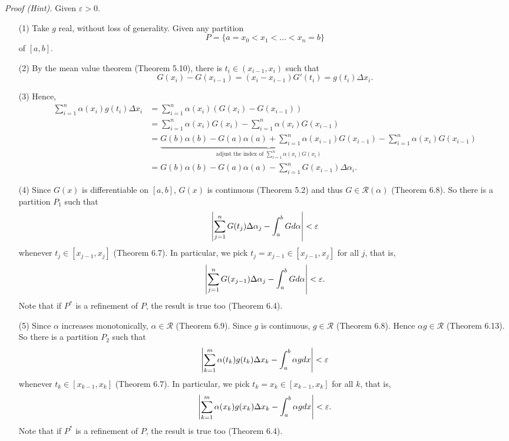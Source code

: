 \documentclass{article}
\begin{document}
\emph{Proof (Hint).}
Given $\varepsilon > 0$.
\begin{enumerate}
  \item[(1)]
  Take $g$ real, without loss of generality.
  Given any partition
  \[
    P = \{a = x_0 < x_1 < \ldots < x_n = b\}
  \]
  of $[a,b]$.

  \item[(2)]
  By the mean value theorem (Theorem 5.10), there is $t_i \in (x_{i-1},x_i)$
  such that
  \[
    G(x_i) - G(x_{i-1}) = (x_i - x_{i-1})G'(t_i) = g(t_i)\Delta x_i.
  \]

  \item[(3)]
  Hence,
  \begin{align*}
    \sum_{i=1}^{n} \alpha(x_i)g(t_i)\Delta x_i
    &= \sum_{i=1}^{n} \alpha(x_i)(G(x_i) - G(x_{i-1})) \\
    &= \sum_{i=1}^{n} \alpha(x_i)G(x_i) - \sum_{i=1}^{n} \alpha(x_i)G(x_{i-1}) \\
    &= \underbrace{G(b)\alpha(b) - G(a)\alpha(a)
      + \sum_{i=1}^{n} \alpha(x_{i-1})G(x_{i-1})}_{\text{
        adjust the index of $\sum_{i=1}^{n} \alpha(x_i)G(x_i)$}}
      - \sum_{i=1}^{n} \alpha(x_i)G(x_{i-1}) \\
    &= G(b)\alpha(b) - G(a)\alpha(a) - \sum_{i=1}^{n} G(x_{i-1}) \Delta\alpha_i.
  \end{align*}

  \item[(4)]
  Since $G(x)$ is differentiable on $[a,b]$,
  $G(x)$ is continuous (Theorem 5.2) and thus $G \in \mathscr{R}(\alpha)$ (Theorem 6.8).
  So there is a partition $P_1$ such that
  \[
    \abs{\sum_{j=1}^{n} G(t_j)\Delta\alpha_j - \int_{a}^{b}G d\alpha }
    < \varepsilon
  \]
  whenever $t_j \in [x_{j-1},x_j]$ (Theorem 6.7).
  In particular, we pick $t_j = x_{j-1} \in [x_{j-1},x_j]$ for all $j$, that is,
  \[
    \abs{\sum_{j=1}^{n} G(x_{j-1})\Delta\alpha_j - \int_{a}^{b}G d\alpha }
    < \varepsilon.
  \]
  Note that if $P^{*}$ is a refinement of $P$, the result is true too (Theorem 6.4).

  \item[(5)]
  Since $\alpha$ increases monotonically, $\alpha \in \mathscr{R}$ (Theorem 6.9).
  Since $g$ is continuous, $g \in \mathscr{R}$ (Theorem 6.8).
  Hence $\alpha g \in \mathscr{R}$ (Theorem 6.13).
  So there is a partition $P_2$ such that
  \[
    \abs{\sum_{k=1}^{m} \alpha(t_k)g(t_k) \Delta x_k - \int_{a}^{b} \alpha g dx }
    < \varepsilon
  \]
  whenever $t_k \in [x_{k-1},x_k]$ (Theorem 6.7).
  In particular, we pick $t_k = x_k \in [x_{k-1},x_k]$ for all $k$, that is,
  \[
    \abs{\sum_{k=1}^{m} \alpha(x_k)g(x_k) \Delta x_k - \int_{a}^{b} \alpha g dx }
    < \varepsilon.
  \]
  Note that if $P^{*}$ is a refinement of $P$, the result is true too (Theorem 6.4).


\end{enumerate}
\end{document}
